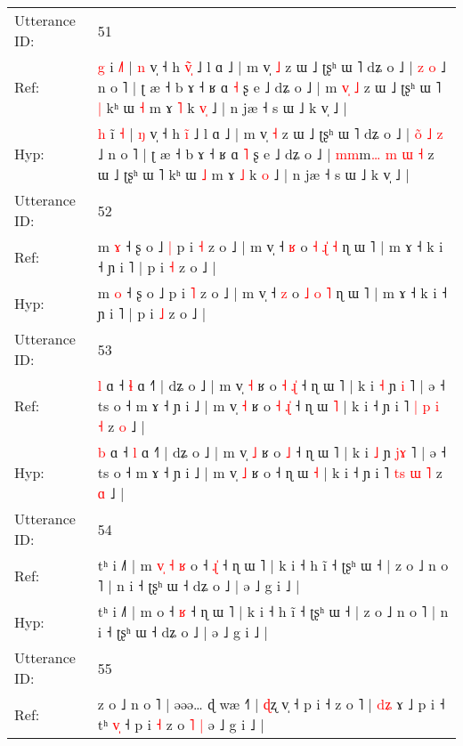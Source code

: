 \documentclass[10pt]{article}
\DeclareRobustCommand{\hl}[1]{{\textcolor{red}{#1}}}
\begin{document}
\begin{longtable}{ll}
 \\
\midrule
Utterance ID: & 51 \\
Ref: & \hl{g} i\hl{ }\hl{˩}\hl{˥} | \hl{n} v̩ ˧ h \hl{v}̃\hl{̩} ˩ l ɑ ˩ | m v̩ \hl{˩} z ɯ ˩ ʈʂʰ ɯ ˥ dʑ o ˩ |\hl{}\hl{}\hl{} \hl{z} \hl{o} ˩ n o ˥ | ʈ æ ˧ b ɤ ˧ ʁ ɑ \hl{˧} ʂ e ˩ dʑ o ˩ | \hl{}\hl{}m\hl{} \hl{}\hl{v}\hl{̩} \hl{˩} z ɯ ˩ ʈʂʰ ɯ ˥\hl{ }\hl{|} kʰ ɯ \hl{˧} m ɤ \hl{˥} k \hl{v}\hl{̩} ˩ | n jæ ˧ s ɯ ˩ k v̩ ˩ |
 \\
Hyp: & \hl{h} i\hl{̃}\hl{ }\hl{˧} | \hl{ŋ} v̩ ˧ h \hl{i}̃\hl{} ˩ l ɑ ˩ | m v̩ \hl{˧} z ɯ ˩ ʈʂʰ ɯ ˥ dʑ o ˩ |\hl{ }\hl{o}\hl{̃} \hl{˩} \hl{z} ˩ n o ˥ | ʈ æ ˧ b ɤ ˧ ʁ ɑ \hl{˥} ʂ e ˩ dʑ o ˩ | \hl{m}\hl{m}m\hl{…} \hl{m}\hl{ }\hl{ɯ} \hl{˧} z ɯ ˩ ʈʂʰ ɯ ˥\hl{}\hl{} kʰ ɯ \hl{˩} m ɤ \hl{˩} k \hl{}\hl{o} ˩ | n jæ ˧ s ɯ ˩ k v̩ ˩ |
 \\
\midrule
Utterance ID: & 52 \\
Ref: & m \hl{ɤ} ˧ ʂ o ˩\hl{ }\hl{|} p i \hl{˧} z o ˩ | m v̩ ˧ \hl{ʁ} o \hl{˧} \hl{ɻ}\hl{̍} \hl{˧} ɳ ɯ ˥ | m ɤ ˧ k i ˧ ɲ i ˥ | p i \hl{˧} z o ˩ |
 \\
Hyp: & m \hl{o} ˧ ʂ o ˩\hl{}\hl{} p i \hl{˥} z o ˩ | m v̩ ˧ \hl{z} o \hl{˩} \hl{}\hl{o} \hl{˥} ɳ ɯ ˥ | m ɤ ˧ k i ˧ ɲ i ˥ | p i \hl{˩} z o ˩ |
 \\
\midrule
Utterance ID: & 53 \\
Ref: & \hl{l} ɑ ˧ \hl{ɬ} ɑ ˧˥ | dʑ o ˩ | m v̩ \hl{˧} ʁ o\hl{ }\hl{˧} \hl{ɻ}\hl{̍} ˧ ɳ ɯ ˥ | k i \hl{˧} ɲ \hl{}\hl{i} ˥ | ə ˧ ts o ˧ m ɤ ˧ ɲ i ˩ | m v̩ \hl{˧} ʁ o\hl{ }\hl{˧}\hl{ }\hl{ɻ}\hl{̍} ˧ ɳ ɯ \hl{˥} | k i ˧ ɲ i ˥ \hl{|}\hl{ }\hl{p} \hl{i} \hl{˧} z \hl{o} ˩ |
 \\
Hyp: & \hl{b} ɑ ˧ \hl{l} ɑ ˧˥ | dʑ o ˩ | m v̩ \hl{˩} ʁ o\hl{}\hl{} \hl{}\hl{˩} ˧ ɳ ɯ ˥ | k i \hl{˩} ɲ \hl{j}\hl{ɤ} ˥ | ə ˧ ts o ˧ m ɤ ˧ ɲ i ˩ | m v̩ \hl{˩} ʁ o\hl{}\hl{}\hl{}\hl{}\hl{} ˧ ɳ ɯ \hl{˧} | k i ˧ ɲ i ˥ \hl{}\hl{t}\hl{s} \hl{ɯ} \hl{˥} z \hl{ɑ} ˩ |
 \\
\midrule
Utterance ID: & 54 \\
Ref: & tʰ i ˩˥ | m\hl{ }\hl{v}\hl{̩}\hl{ }\hl{˧}\hl{ }\hl{ʁ} o ˧ \hl{ɻ}\hl{̍} ˧ ɳ ɯ ˥ | k i ˧ h ĩ ˧ ʈʂʰ ɯ ˧ | z o ˩ n o ˥ | n i ˧ ʈʂʰ ɯ ˧ dʑ o ˩ | ə ˩ g i ˩ |
 \\
Hyp: & tʰ i ˩˥ | m\hl{}\hl{}\hl{}\hl{}\hl{}\hl{}\hl{} o ˧ \hl{}\hl{ʁ} ˧ ɳ ɯ ˥ | k i ˧ h ĩ ˧ ʈʂʰ ɯ ˧ | z o ˩ n o ˥ | n i ˧ ʈʂʰ ɯ ˧ dʑ o ˩ | ə ˩ g i ˩ |
 \\
\midrule
Utterance ID: & 55 \\
Ref: & z o ˩ n o ˥ | əəə… ɖ\hl{} wæ ˧˥ | \hl{ɖ}ʐ v̩ ˧ p i ˧ z o ˥ | \hl{d}\hl{ʑ} ɤ ˩ p i ˧ t\hl{}ʰ \hl{v}\hl{̩} ˧ p i \hl{˧} z o\hl{ }\hl{˥} \hl{|} ə ˩ g i ˩ |

\end{longtable}
\end{document}
